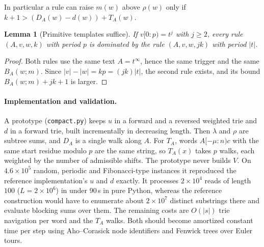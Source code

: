 \documentclass[11pt]{article}
\numberwithin{equation}{section}
\newtheorem{lemma}[theorem]{Lemma}
\theoremstyle{definition}
\newcommand{\len}[1]{\lvert #1\rvert}
\begin{document}
In particular a rule can raise $m(w)$ above $\rho(w)$ only if
$k+1>(D_A(w)-d(w))+T_A(w)$.

\begin{lemma}[Primitive templates suffice]\label{lem:primitive}
If $v[0:p)=t^j$ with $j\ge2$, every rule $(A,v,w,k)$ with period $p$ is
dominated by the rule $(A,v,w,jk)$ with period $\len t$.
\end{lemma}

\begin{proof}
Both rules use the same text $A=t^\infty$, hence the same trigger and the
same $B_A(w;m)$. Since $\len v-\len w=kp=(jk)\len t$, the second rule
exists, and its bound $B_A(w;m)+jk+1$ is larger.
\end{proof}

\paragraph{Implementation and validation.}
A prototype (\texttt{compact.py}) keeps $u$ in a forward and a reversed weighted
trie and $d$ in a forward trie, built incrementally in decreasing length.
Then $\lambda$ and $\rho$ are subtree sums, and $D_A$ is a single walk along $A$.
For $T_A$, words $A[-\mu:n)c$ with the same start residue modulo $p$ are the same
string, so $T_A(x)$ takes $p$ walks, each weighted by the number of admissible
shifts. The prototype never builds $V$. On $4.6\times10^5$ random, periodic
and Fibonacci-type instances it reproduced the reference implementation's $u$
and $d$ exactly. It processes $2\times10^4$ reads of length $100$
($L=2\times10^6$) in under 90\,s in pure Python, whereas the reference
construction would have to enumerate about $2\times10^7$ distinct substrings there and evaluate blocking sums over them. The remaining costs are $O(\len s)$ trie navigation per
word and the $T_A$ walks. Both should become amortized constant time per
step using Aho--Corasick node identifiers and Fenwick trees over Euler tours.
\end{document}
